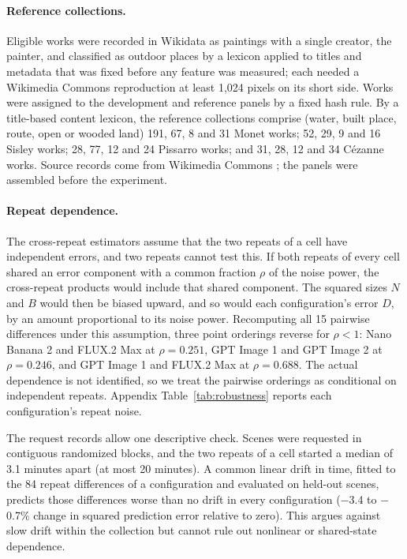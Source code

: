 \paragraph{Reference collections.}
Eligible works were recorded in Wikidata as paintings with a single creator, the painter, and
classified as outdoor places by a lexicon applied to titles and metadata that was fixed before
any feature was measured; each needed a Wikimedia Commons reproduction at least 1,024 pixels on
its short side. Works were assigned to the development and reference panels by a fixed hash
rule. By a title-based content lexicon, the reference collections comprise (water, built place,
route, open or wooded land) 191, 67, 8 and 31 Monet works; 52, 29, 9 and 16 Sisley works; 28,
77, 12 and 24 Pissarro works; and 31, 28, 12 and 34 C\'ezanne works. Source records come from Wikimedia
Commons \citep{wikimediacommons}; the panels were assembled before the experiment.

\paragraph{Repeat dependence.}
The cross-repeat estimators assume that the two repeats of a cell have independent errors, and
two repeats cannot test this. If both repeats of every cell shared an error component with a
common fraction $\rho$ of the noise power, the cross-repeat products would include that shared
component. The squared sizes $N$ and $B$ would then be biased upward, and so would each
configuration's error $D$, by an amount proportional to its noise power. Recomputing all 15
pairwise differences under this assumption, three point orderings reverse for $\rho<1$: Nano
Banana 2 and FLUX.2 Max at $\rho=0.251$, GPT Image 1 and GPT Image 2 at $\rho=0.246$, and GPT
Image 1 and FLUX.2 Max at $\rho=0.688$. The actual dependence is not identified, so we treat the
pairwise orderings as conditional on independent repeats. Appendix Table~\ref{tab:robustness}
reports each configuration's repeat noise.

The request records allow one descriptive check. Scenes were requested in contiguous randomized
blocks, and the two repeats of a cell started a median of 3.1 minutes apart (at most 20 minutes).
A common linear drift in time, fitted to the 84 repeat differences of a configuration and
evaluated on held-out scenes, predicts those differences worse than no drift in every
configuration ($-$3.4 to $-$0.7\% change in squared prediction error relative to zero). This
argues against slow drift within the collection but cannot rule out nonlinear or shared-state
dependence.

